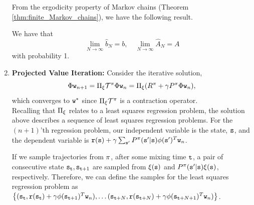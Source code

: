 \begin{enumerate}
From the ergodicity property of Markov chains (Theorem \ref{thm:finite_Markov_chains}), we have the following result.
\begin{proposition}
We have that 
\begin{equation*}
    \lim_{N\to \infty} \widehat{b}_N = b, \quad \lim_{N\to \infty} \widehat{A}_N = A
\end{equation*}
with probability 1.
\end{proposition}

\item \textbf{Projected Value Iteration:}
Consider the iterative solution,
$$\Phi {\tt w}_{n+1} = \Pi_\xi \mathcal{T}^\pi \Phi {\tt w}_n = \Pi_\xi(R^\pi+\gamma P^\pi \Phi {\tt w}_n),$$
which converges to ${\tt w}^*$ since $\Pi_\xi \mathcal{T}^\pi$ is a contraction operator.\\

Recalling that $\Pi_\xi$ relates to a least squares regression problem, the solution above describes a sequence of least squares regression problems. For the $(n+1)$'th regression problem, our independent variable is the state, ${\tt s}$, and the dependent variable is ${\tt r}({\tt s}) +\gamma \sum_{{\tt s}'}P^\pi({\tt s}'|{\tt s}) \phi({\tt s}')^T {\tt w}_n$.

If we sample trajectories from $\pi$, after some mixing time ${\tt t}$, a pair of consecutive state ${\tt s}_{\tt t}, {\tt s}_{{\tt t}+1}$ are sampled from $\xi({\tt s})$ and $P^\pi({\tt s}'|{\tt s})\xi({\tt s})$, respectively. Therefore, we can define the samples for the least squares regression problem as $\left\{({\tt s}_{\tt t}, {\tt r}({\tt s}_{\tt t}) +\gamma \phi({\tt s}_{{\tt t}+1})^T {\tt w}_n), \dots  ({\tt s}_{{\tt t}+N}, {\tt r}({\tt s}_{{\tt t}+N}) +\gamma \phi({\tt s}_{{\tt t}+N+1})^T {\tt w}_n)\right\}$.



\end{enumerate}
